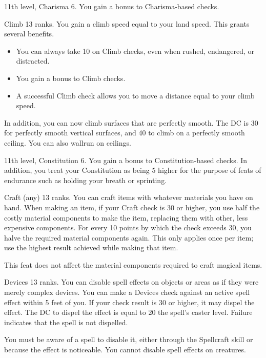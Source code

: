 \featpre 11th level, Charisma 6.
\featben You gain a  bonus to Charisma-based checks.

\featpre Climb 13 ranks.
\featben You gain a climb speed equal to your land speed. This grants several benefits.
\begin{itemize}
    \item You can always take 10 on Climb checks, even when rushed, endangered, or distracted.
    \item You gain a  bonus to Climb checks.
    \item A successful Climb check allows you to move a distance equal to your climb speed.
\end{itemize}

In addition, you can now climb surfaces that are perfectly smooth. The DC is 30 for perfectly smooth vertical surfaces, and 40 to climb on a perfectly smooth ceiling. You can also wallrun on ceilings.

\featpre 11th level, Constitution 6.
\featben You gain a  bonus to Constitution-based checks. In addition, you treat your Constitution as being 5 higher for the purpose of feats of endurance such as holding your breath or sprinting.

\featpre Craft (any) 13 ranks.
\featben You can craft items with whatever materials you have on hand. When making an item, if your Craft check is 30 or higher, you use half the costly material components to make the item, replacing them with other, less expensive components. For every 10 points by which the check exceeds 30, you halve the required material components again. This only applies once per item; use the highest result achieved while making that item.

This feat does not affect the material components required to craft magical items.

\featpre Devices 13 ranks.
\featben You can disable spell effects on objects or areas as if they were merely complex devices. You can make a Devices check against an active spell effect within 5 feet of you. If your check result is 30 or higher, it may dispel the effect. The DC to dispel the effect is equal to 20 \add the spell's caster level. Failure indicates that the spell is not dispelled.

You must be aware of a spell to disable it, either through the Spellcraft skill or because the effect is noticeable. You cannot disable spell effects on creatures.

